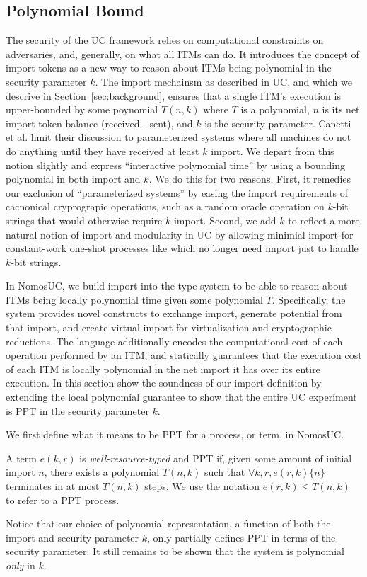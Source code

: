 \subsection{Polynomial Bound}
The security of the UC framework relies on computational constraints on adversaries, and, generally, on what all ITMs can do.
It introduces the concept of import tokens as a new way to reason about ITMs being polynomial in the security parameter $k$. 
The import mechainsm as described in UC, and which we descrive in Section~\ref{sec:background}, ensures that a single ITM's execution is upper-bounded by some poynomial $T(n,k)$ where $T$ is a polynomial, $n$ is its net import token balance (received - sent), and $k$ is the security parameter.
Canetti et al. limit their discussion to parameterized systems where all machines do not do anything until they have received at least $k$ import.
We depart from this notion slightly and express ``interactive polynomial time'' by using a bounding polynomial in both import and $k$.
We do this for two reasons.
First, it remedies our exclusion of ``parameterized systems'' by easing the import requirements of cacnonical cryprograpic operations, such as a random oracle operation on $k$-bit strings that would otherwise require $k$ import. 
Second, we add $k$ to reflect a more natural notion of import and modularity in UC by allowing minimial import for constant-work one-shot processes like \Fcom which no longer need import just to handle $k$-bit strings.

In NomosUC, we build import into the type system to be able to reason about ITMs being locally polynomial time given some polynomial $T$.
Specifically, the system provides novel constructs to exchange import, generate potential from that import, and create virtual import for virtualization and cryptographic reductions.
The language additionally encodes the computational cost of each operation performed by an ITM, and statically guarantees that the execution cost of each ITM is locally polynomial in the net import it has over its entire execution. 
In this section show the soundness of our import definition by extending the local polynomial guarantee to show that the entire UC experiment is PPT in the security parameter $k$.

We first define what it means to be PPT for a process, or term, in NomosUC. 
\begin{ddef}[PPT in $k$]\label{def:ppt}
A term $e(k,r)$ is \emph{well-resource-typed} and PPT if, given some amount of initial import $n$, there exists a polynomial $T(n,k)$ such that $\forall k, r, e(r,k) \{n\}$ terminates in at most $T(n,k)$ steps.
We use the notation $e(r,k) \leq T(n,k)$ to refer to a PPT process.
\end{ddef}
Notice that our choice of polynomial representation, a function of both the import and security parameter $k$, only partially defines PPT in terms of the security parameter. It still remains to be shown that the system is polynomial \emph{only} in $k$.

